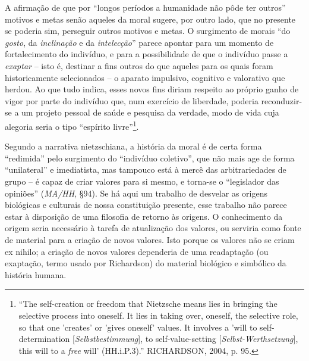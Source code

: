 \documentclass[
	12pt,				%
	openright,			%
	oneside,			%
	a4paper,			%
	english,			%
	french,				%
	spanish,			%
	brazil				%
	]{abntex2}
\begin{document}
A afirmação de que por “longos períodos a humanidade não pôde ter outros” motivos e metas senão aqueles da moral sugere, por outro lado, que no presente se poderia sim, perseguir outros motivos e metas. O surgimento de morais “do \textit{gosto}, da \textit{inclinação} e da \textit{intelecção}” parece apontar para um momento de fortalecimento do indivíduo, e para a possibilidade de que o indivíduo passe a \textit{exaptar} – isto é, destinar a fins outros do que aqueles para os quais foram historicamente selecionados – o aparato impulsivo, cognitivo e valorativo que herdou. Ao que tudo indica, esses novos fins diriam respeito ao próprio ganho de vigor por parte do indivíduo que, num exercício de liberdade, poderia reconduzir-se a um projeto pessoal de saúde e pesquisa da verdade, modo de vida cuja alegoria seria o tipo “espírito livre”\footnote{“The self-creation or freedom that Nietzsche means lies in bringing the selective process into oneself. It lies in taking over, oneself, the selective role, so that one 'creates' or 'gives oneself' values. It involves a 'will to self-determination [\textit{Selbstbestimmung}], to self-value-setting [\textit{Selbst-Werthsetzung}], this will to a \textit{free} will' (HH.i.P.3).” RICHARDSON, 2004, p. 95.}.

Segundo a narrativa nietzschiana, a história da moral é de certa forma “redimida” pelo surgimento do “indivíduo coletivo”, que não mais age de forma “unilateral” e imediatista, mas tampouco está à mercê das arbitrariedades de grupo – é capaz de criar valores para si mesmo, e torna-se o “legislador das opiniões” (\textit{MA/HH}, §94). Se há aqui um trabalho de desvelar as origens biológicas e culturais de nossa constituição presente, esse trabalho não parece estar à disposição de uma filosofia de retorno às origens. O conhecimento da origem seria necessário à tarefa de atualização dos valores, ou serviria como fonte de material para a criação de novos valores. Isto porque os valores não se criam ex nihilo; a criação de novos valores dependeria de uma readaptação (ou exaptação, termo usado por Richardson) do material biológico e simbólico da história humana. 	
\end{document}
